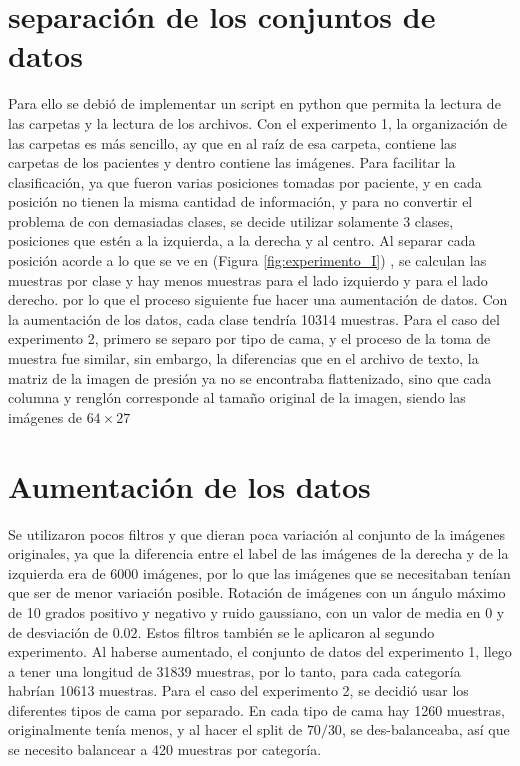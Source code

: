 \documentclass[12pt,a4paper]{report}
\begin{document}
\section {separación de los conjuntos de datos}
Para ello se debió de implementar un script en python que permita la lectura de las carpetas y la lectura de los archivos. Con el experimento 1, la organización de las carpetas es más sencillo, ay que en al raíz de esa carpeta, contiene las carpetas de los pacientes y dentro contiene las imágenes.
Para facilitar la clasificación, ya que fueron varias posiciones tomadas por paciente, y en cada posición no tienen la misma cantidad de información, y para no convertir el problema de con demasiadas clases, se decide utilizar solamente 3 clases, posiciones que estén a la izquierda, a la derecha y al centro.
Al separar cada posición acorde a lo que se ve en (Figura \ref{fig:experimento_I}) , se calculan las muestras por clase y hay menos muestras para el lado izquierdo y para el lado derecho. por lo que el proceso siguiente fue hacer una aumentación de datos. Con la aumentación de los datos, cada clase tendría 10314 muestras.
Para el caso del experimento 2, primero se separo por tipo de cama, y el proceso de la toma de muestra fue similar, sin embargo, la diferencias que en el archivo de texto, la matriz de la imagen de presión ya no se encontraba flattenizado, sino que cada columna y renglón corresponde al tamaño original de la imagen, siendo las imágenes de $64 \times 27$
\section{Aumentación de los datos}
Se utilizaron pocos filtros y que dieran poca variación al conjunto de la imágenes originales, ya que la diferencia entre el label de las imágenes de la derecha y de la izquierda era de 6000 imágenes, por lo que las imágenes que se necesitaban tenían que ser de menor variación posible. Rotación de imágenes con un ángulo máximo de 10 grados positivo y negativo y ruido gaussiano, con un valor de media en 0 y de desviación de $0.02$.
Estos filtros también se le aplicaron al segundo experimento. 
Al haberse aumentado, el conjunto de datos del experimento 1, llego a tener una longitud de 31839 muestras, por lo tanto, para cada categoría habrían 10613 muestras.
Para el caso del experimento 2, se decidió usar los diferentes tipos de cama por separado. En cada tipo de cama hay 1260 muestras, originalmente tenía menos, y al hacer el split de $70/30$, se des-balanceaba, así que se necesito balancear a 420 muestras por categoría.
\end{document}
